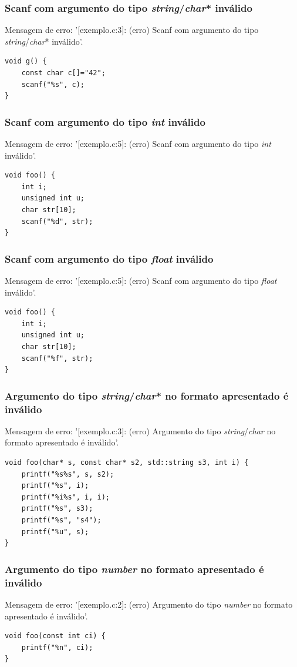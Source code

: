 \documentclass[12pt,a4paper]{report}
\begin{document}
\subsubsection{Scanf com argumento do tipo \textit{string}/\textit{char}* inválido}
Mensagem de erro: '[exemplo.c:3]: (erro) Scanf com argumento do tipo \textit{string}/\textit{char}* inválido'.
\begin{lstlisting}[style=CStyle]
void g() {
    const char c[]="42";
    scanf("%s", c);
}
\end{lstlisting}

\subsubsection{Scanf com argumento do tipo \textit{int} inválido}
Mensagem de erro: '[exemplo.c:5]: (erro) Scanf com argumento do tipo \textit{int} inválido'.
\begin{lstlisting}[style=CStyle]
void foo() {
    int i;
    unsigned int u;
    char str[10];
    scanf("%d", str);
}
\end{lstlisting}

\subsubsection{Scanf com argumento do tipo \textit{float} inválido}
Mensagem de erro: '[exemplo.c:5]: (erro) Scanf com argumento do tipo \textit{float} inválido'.
\begin{lstlisting}[style=CStyle]
void foo() {
    int i;
    unsigned int u;
    char str[10];
    scanf("%f", str);
}
\end{lstlisting}

\subsubsection{Argumento do tipo \textit{string}/\textit{char}* no formato apresentado é inválido}
Mensagem de erro: '[exemplo.c:3]: (erro) Argumento do tipo \textit{string}/\textit{char} no formato apresentado é inválido'.
\begin{lstlisting}[style=CStyle]
void foo(char* s, const char* s2, std::string s3, int i) {
    printf("%s%s", s, s2);
    printf("%s", i);
    printf("%i%s", i, i);
    printf("%s", s3);
    printf("%s", "s4");
    printf("%u", s);
}
\end{lstlisting}

\subsubsection{Argumento do tipo \textit{number} no formato apresentado é inválido}
Mensagem de erro: '[exemplo.c:2]: (erro) Argumento do tipo \textit{number} no formato apresentado é inválido'.
\begin{lstlisting}[style=CStyle]
void foo(const int ci) {
    printf("%n", ci);
}
\end{lstlisting}
\end{document}
